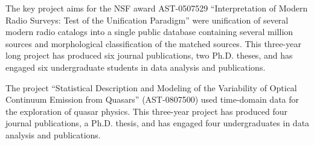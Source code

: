 The key project aims for the NSF award AST-0507529 ``Interpretation of Modern Radio 
Surveys: Test of the Unification Paradigm'' were unification of several modern radio 
catalogs into a single public database containing several million sources and 
morphological classification of the matched sources. This three-year long project has 
produced six journal publications, two Ph.D. theses, and has engaged six undergraduate 
students in data analysis and publications. 

The project ``Statistical Description and Modeling of the Variability of Optical Continuum 
Emission from Quasars'' (AST-0807500) used time-domain data for the exploration of quasar 
physics. This three-year project has produced four journal publications, a Ph.D. thesis, and has 
engaged four undergraduates in data analysis and publications. 


